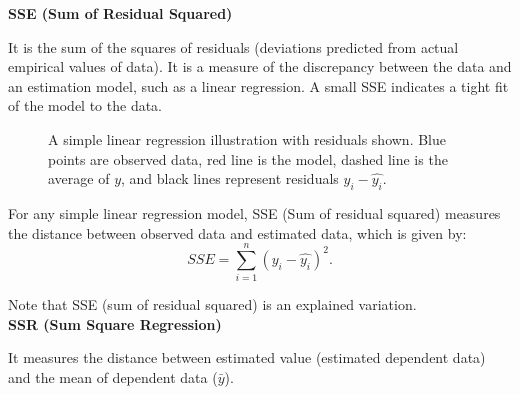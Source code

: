 \textbf{SSE (Sum of Residual Squared)}

It is the sum of the squares of residuals (deviations predicted from actual empirical values of data). It is a measure of the discrepancy between the data and an estimation model, such as a linear regression. A small SSE indicates a tight fit of the model to the data.

\begin{figure}[h]
\centering
{}
\caption{A simple linear regression illustration with residuals shown. Blue points are observed data, red line is the model, dashed line is the average of $y$, and black lines represent residuals $y_i - \hat{y_i}$.}
\end{figure}

\begin{definition}
For any simple linear regression model, SSE (Sum of residual squared) measures the distance between observed data and estimated data, which is given by: \[ SSE = \sum_{i=1}^{n} (y_i - \hat{y_i})^2.\]
\end{definition}

Note that SSE (sum of residual squared) is an explained variation.\\

\textbf{SSR (Sum Square Regression)}

It measures the distance between estimated value (estimated dependent data) and the mean of dependent data ($\bar{y}$).

